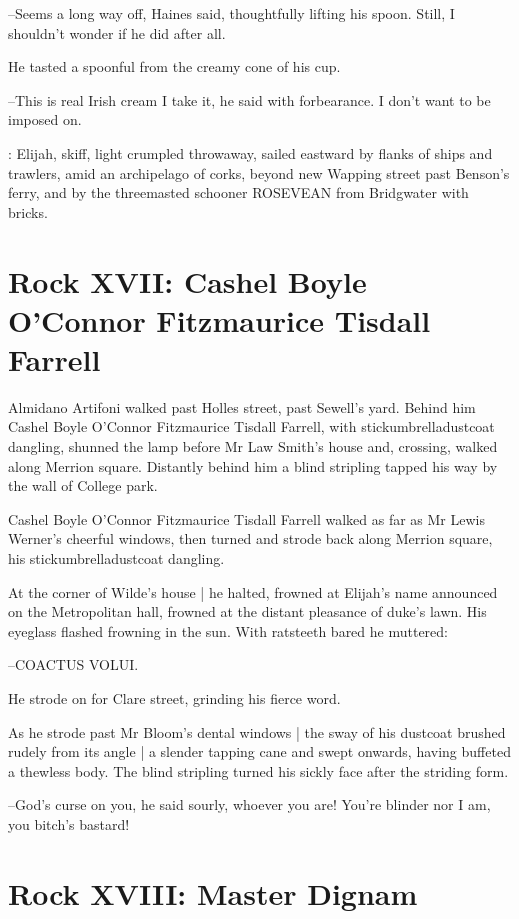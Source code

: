 --Seems a long way off,
Haines said,
thoughtfully lifting his spoon.
Still, I shouldn't wonder if he did after all.

He tasted a spoonful from the creamy cone of his cup.

--This is real Irish cream I take it,
he said with forbearance.
I don't want to be imposed on.

:
Elijah,
skiff,
light crumpled throwaway,
sailed eastward by flanks of
ships and trawlers,
amid an archipelago of corks,
beyond new Wapping
street
past Benson's ferry,
and by the threemasted schooner ROSEVEAN from
Bridgwater with bricks.


\section*{Rock XVII: Cashel Boyle O'Connor Fitzmaurice Tisdall Farrell}


Almidano Artifoni walked past Holles street,
past Sewell's yard.
Behind him
Cashel Boyle O'Connor Fitzmaurice Tisdall Farrell,
with
stickumbrelladustcoat dangling,
shunned the lamp before Mr Law Smith's
house
and, crossing, walked along Merrion square.
Distantly behind him a
blind stripling
tapped his way by the wall of College park.

Cashel Boyle O'Connor Fitzmaurice Tisdall Farrell
walked as far as
Mr Lewis Werner's cheerful windows,
then turned and strode back along
Merrion square,
his stickumbrelladustcoat dangling.

At the corner of Wilde's house |
he halted,
frowned at Elijah's name announced on the Metropolitan hall,
frowned at the distant pleasance of duke's lawn.
His eyeglass flashed frowning in the sun.
With ratsteeth bared he muttered:

--COACTUS VOLUI.

He strode on for Clare street,
grinding his fierce word.

As he strode past Mr Bloom's dental windows |
the sway of his dustcoat brushed rudely from its angle |
a slender tapping cane and swept onwards,
having buffeted a thewless body.
The blind stripling turned his sickly face after the striding form.

--God's curse on you,
he said sourly,
whoever you are!
You're blinder nor I am,
you bitch's bastard!


\section*{Rock XVIII: Master Dignam}



